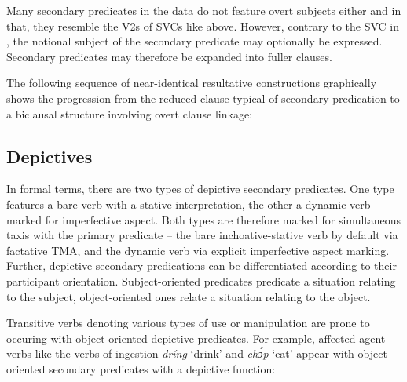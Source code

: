 Many secondary predicates in the data do not feature overt subjects either and in that, they resemble the V2s of SVCs like  above. However, contrary to the SVC in , the notional subject of the secondary predicate may optionally be expressed. Secondary predicates may therefore be expanded into fuller clauses. 


The following sequence of near-identical resultative constructions graphically shows the progression from the reduced clause typical of secondary predication to a biclausal structure involving overt clause linkage:



\ea%
    \label{ex:key:1590}
\z\z

\subsection{Depictives}\label{sec:11.3.2}

In formal terms, there are two types of depictive secondary predicates. One type features a bare verb with a stative interpretation, the other a dynamic verb marked for imperfective aspect. Both types are therefore marked for simultaneous taxis with the primary predicate – the bare inchoative-stative verb by default via factative TMA, and the dynamic verb via explicit imperfective aspect marking. Further, depictive secondary predications can be differentiated according to their participant orientation. Subject-oriented predicates predicate a situation relating to the subject, object-oriented ones relate a situation relating to the object. 


Transitive verbs denoting various types of use or manipulation are prone to occuring with object-oriented depictive predicates. For example, affected-agent verbs\index{} like the verbs of ingestion \textit{dríng} ‘drink’ and \textit{chɔ́p} ‘eat’ appear with object-oriented secondary predicates with a depictive function:



